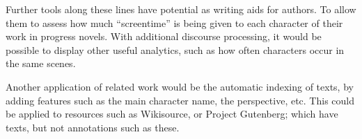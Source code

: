 \documentclass[11pt,a4paper]{article}
\begin{document}
Further tools along these lines have potential as writing aids for authors.
To allow them to assess how much ``screentime'' is being given to each character of their work in progress novels.
With additional discourse processing, it would be possible to display other useful analytics, such as how often characters occur in the same scenes.

Another application of related work would be the automatic indexing of texts, by adding features such as the main character name, the perspective, etc.
This could be applied to resources such as Wikisource, or Project Gutenberg;
which have texts, but not annotations such as these.




\clearpage

\end{document}
